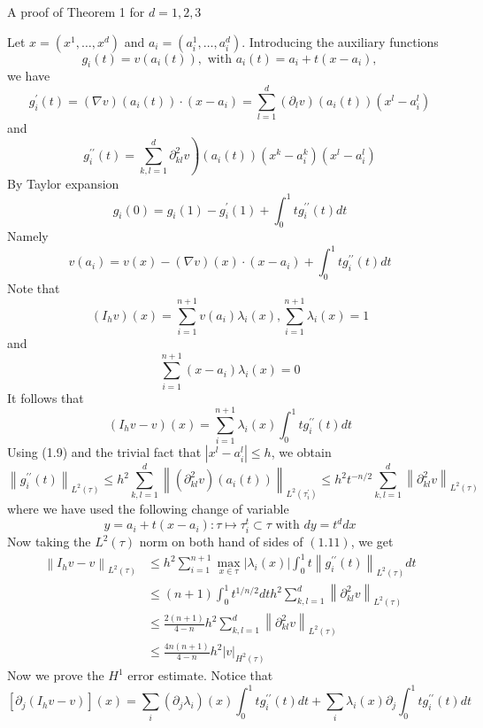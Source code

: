\documentclass[10pt]{article}
\begin{document}
A proof of Theorem 1 for $d=1,2,3$

Let $x=\left(x^{1}, \ldots, x^{d}\right)$ and $a_{i}=\left(a_{i}^{1}, \ldots, a_{i}^{d}\right) .$ Introducing the auxiliary functions
$$
g_{i}(t)=v\left(a_{i}(t)\right), \text { with } a_{i}(t)=a_{i}+t\left(x-a_{i}\right),
$$
we have
$$
g_{i}^{\prime}(t)=(\nabla v)\left(a_{i}(t)\right) \cdot\left(x-a_{i}\right)=\sum_{l=1}^{d}\left(\partial_{l} v\right)\left(a_{i}(t)\right)\left(x^{l}-a_{i}^{l}\right)
$$
and
$$
\left.g_{i}^{\prime \prime}(t)=\sum_{k, l=1}^{d} \partial_{k l}^{2} v\right)\left(a_{i}(t)\right)\left(x^{k}-a_{i}^{k}\right)\left(x^{l}-a_{i}^{l}\right)
$$
By Taylor expansion
$$
g_{i}(0)=g_{i}(1)-g_{i}^{\prime}(1)+\int_{0}^{1} t g_{i}^{\prime \prime}(t) d t
$$
Namely
$$
v\left(a_{i}\right)=v(x)-(\nabla v)(x) \cdot\left(x-a_{i}\right)+\int_{0}^{1} t g_{i}^{\prime \prime}(t) d t
$$
Note that
$$
\left(I_{h} v\right)(x)=\sum_{i=1}^{n+1} v\left(a_{i}\right) \lambda_{i}(x), \sum_{i=1}^{n+1} \lambda_{i}(x)=1
$$
and
$$
\sum_{i=1}^{n+1}\left(x-a_{i}\right) \lambda_{i}(x)=0
$$
It follows that
$$
\left(I_{h} v-v\right)(x)=\sum_{i=1}^{n+1} \lambda_{i}(x) \int_{0}^{1} t g_{i}^{\prime \prime}(t) d t
$$
Using (1.9) and the trivial fact that $\left|x^{l}-a_{i}^{l}\right| \leq h$, we obtain
$$
\left\|g_{i}^{\prime \prime}(t)\right\|_{L^{2}(\tau)} \leq h^{2} \sum_{k, l=1}^{d}\left\|\left(\partial_{k l}^{2} v\right)\left(a_{i}(t)\right)\right\|_{L^{2}\left(\tau_{i}^{\prime}\right)} \leq h^{2} t^{-n / 2} \sum_{k, l=1}^{d}\left\|\partial_{k l}^{2} v\right\|_{L^{2}(\tau)}
$$
where we have used the following change of variable
$$
y=a_{i}+t\left(x-a_{i}\right): \tau \mapsto \tau_{i}^{t} \subset \tau \text { with } d y=t^{d} d x
$$
Now taking the $L^{2}(\tau)$ norm on both hand of sides of $(1.11)$, we get
$$
\begin{aligned}
\left\|I_{h} v-v\right\|_{L^{2}(\tau)} & \leq h^{2} \sum_{i=1}^{n+1} \max _{x \in \tau}\left|\lambda_{i}(x)\right| \int_{0}^{1} t\left\|g_{i}^{\prime \prime}(t)\right\|_{L^{2}(\tau)} d t \\
& \leq(n+1) \int_{0}^{1} t^{1 / n / 2} d t h^{2} \sum_{k, l=1}^{d}\left\|\partial_{k l}^{2} v\right\|_{L^{2}(\tau)} \\
& \leq \frac{2(n+1)}{4-n} h^{2} \sum_{k, l=1}^{d}\left\|\partial_{k l}^{2} v\right\|_{L^{2}(\tau)} \\
& \leq \frac{4 n(n+1)}{4-n} h^{2}|v|_{H^{2}(\tau)}
\end{aligned}
$$
Now we prove the $H^{1}$ error estimate. Notice that
$$
\left[\partial_{j}\left(I_{h} v-v\right)\right](x)=\sum_{i}\left(\partial_{j} \lambda_{i}\right)(x) \int_{0}^{1} t g_{i}^{\prime \prime}(t) d t+\sum_{i} \lambda_{i}(x) \partial_{j} \int_{0}^{1} t g_{i}^{\prime \prime}(t) d t
$$
\end{document}
